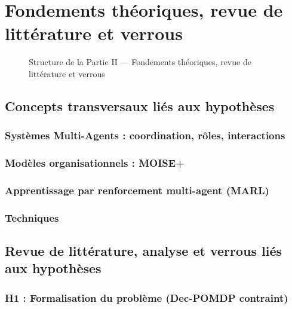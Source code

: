 \documentclass[ twoside,openright,titlepage,numbers=noenddot,headinclude,%
                footinclude=true,cleardoublepage=empty,abstractoff, %
                BCOR=5mm,paper=a4,fontsize=11pt,%
                french,american,%
                ]{scrreprt}
\begin{document}

\part{Fondements théoriques, revue de littérature et verrous}

\begin{figure}[h!]
\centering

\caption{Structure de la Partie II — Fondements théoriques, revue de littérature et verrous}
\end{figure}

\chapter{Concepts transversaux liés aux hypothèses}

\section{Systèmes Multi-Agents : coordination, rôles, interactions}
\section{Modèles organisationnels : MOISE+}

\section{Apprentissage par renforcement multi-agent (MARL)}

\section{Techniques }

\chapter{Revue de littérature, analyse et verrous liés aux hypothèses}

\section{H1 : Formalisation du problème (Dec-POMDP contraint)}
\end{document}
